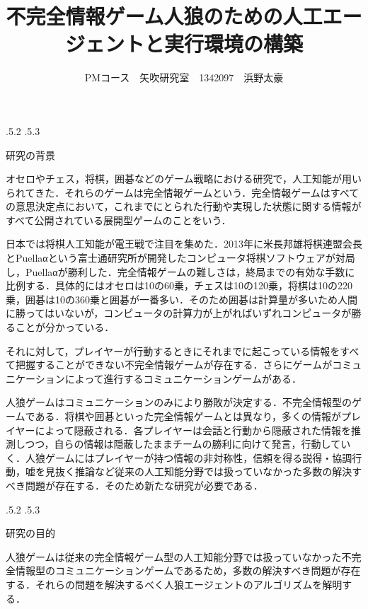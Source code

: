 \documentclass[uplatex]{jsarticle}
\title{\vspace{-14mm}不完全情報ゲーム人狼のための人工エージェントと実行環境の構築}
\author{PMコース　矢吹研究室　1342097　浜野太豪}
\date{}%
\makeatletter
\renewcommand{\section}{%
    \if@slide\clearpage\fi
    \@startsection{section}{1}{\z@}%
    {\Cvs \@plus.5\Cdp \@minus.2\Cdp}%
    {.5\Cvs \@plus.3\Cdp}%
    {\normalfont\raggedright}}
\makeatother
\begin{document}
\maketitle





\section{研究の背景}

オセロやチェス，将棋，囲碁などのゲーム戦略における研究で，人工知能が用いられてきた．それらのゲームは完全情報ゲームという．完全情報ゲームはすべての意思決定点において，これまでにとられた行動や実現した状態に関する情報がすべて公開されている展開型ゲームのことをいう\cite{okumura2013}．

日本では将棋人工知能が電王戦で注目を集めた．2013年に米長邦雄将棋連盟会長とPuellaαという富士通研究所が開発したコンピュータ将棋ソフトウェアが対局し，Puellaαが勝利した．完全情報ゲームの難しさは，終局までの有効な手数に比例する．具体的にはオセロは10の60乗，チェスは10の120乗，将棋は10の220乗，囲碁は10の360乗と囲碁が一番多い\cite{jinro2}．そのため囲碁は計算量が多いため人間に勝ってはいないが，コンピュータの計算力が上がればいずれコンピュータが勝ることが分かっている．

それに対して，プレイヤーが行動するときにそれまでに起こっている情報をすべて把握することができない不完全情報ゲームが存在する\cite{wiki2}．さらにゲームがコミュニケーションによって進行するコミュニケーションゲームがある．

人狼ゲームはコミュニケーションのみにより勝敗が決定する．不完全情報型のゲームである．将棋や囲碁といった完全情報ゲームとは異なり，多くの情報がプレイヤーによって隠蔽される．各プレイヤーは会話と行動から隠蔽された情報を推測しつつ，自らの情報は隠蔽したままチームの勝利に向けて発言，行動していく．人狼ゲームにはプレイヤーが持つ情報の非対称性，信頼を得る説得・協調行動，嘘を見抜く推論など従来の人工知能分野では扱っていなかった多数の解決すべき問題が存在する\cite{jinro1}．そのため新たな研究が必要である．


\section{研究の目的}

人狼ゲームは従来の完全情報ゲーム型の人工知能分野では扱っていなかった不完全情報型のコミュニケーションゲームであるため，多数の解決すべき問題が存在する．それらの問題を解決するべく人狼エージェントのアルゴリズムを解明する．
\end{document}
